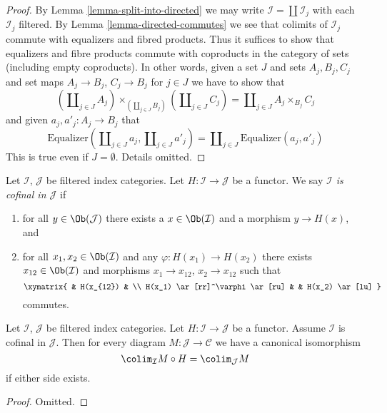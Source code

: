\begin{proof}
By
Lemma \ref{lemma-split-into-directed}
we may write $\mathcal{I} = \coprod \mathcal{I}_j$ with each $\mathcal{I}_j$
filtered. By
Lemma \ref{lemma-directed-commutes}
we see that colimits of $\mathcal{I}_j$ commute with equalizers and
fibred products. Thus it suffices to show that equalizers and fibre products
commute with coproducts in the category of sets (including empty coproducts).
In other words, given a set $J$ and sets $A_j, B_j, C_j$ and set maps
$A_j \to B_j$, $C_j \to B_j$ for $j \in J$ we have to show that
$$
(\coprod\nolimits_{j \in J} A_j)
\times_{(\coprod\nolimits_{j \in J} B_j)}
(\coprod\nolimits_{j \in J} C_j)
=
\coprod\nolimits_{j \in J} A_j \times_{B_j} C_j
$$
and given $a_j, a'_j : A_j \to B_j$ that
$$
\text{Equalizer}(
\coprod\nolimits_{j \in J} a_j,
\coprod\nolimits_{j \in J} a'_j)
=
\coprod\nolimits_{j \in J}
\text{Equalizer}(a_j, a'_j)
$$
This is true even if $J = \emptyset$. Details omitted.
\end{proof}

\begin{definition}
\label{definition-cofinal-filtered}
Let $\mathcal{I}$, $\mathcal{J}$ be filtered index categories.
Let $H : \mathcal{I} \to \mathcal{J}$ be a functor. We say
{\it $\mathcal{I}$ is cofinal in $\mathcal{J}$} if
\begin{enumerate}
\item for all $y \in \Ob(\mathcal{J})$ there exists a
$x \in \Ob(\mathcal{I})$ and a morphism $y \to H(x)$, and
\item for all $x_1, x_2 \in \Ob(\mathcal{I})$ and any
$\varphi : H(x_1) \to H(x_2)$ there exists $x_{12} \in \Ob(\mathcal{I})$
and morphisms $x_1 \to x_{12}$, $x_2 \to x_{12}$ such that
$$
\xymatrix{
& H(x_{12}) & \\
H(x_1) \ar[rr]^\varphi \ar[ru] & & H(x_2) \ar[lu]
}
$$
commutes.
\end{enumerate}
\end{definition}

\begin{lemma}
\label{lemma-cofinal-filtered}
Let $\mathcal{I}$, $\mathcal{J}$ be filtered index categories.
Let $H : \mathcal{I} \to \mathcal{J}$ be a functor. Assume
$\mathcal{I}$ is cofinal in $\mathcal{J}$. Then for every diagram
$M : \mathcal{J} \to \mathcal{C}$ we have a canonical isomorphism
$$
\colim_\mathcal{I} M \circ H
=
\colim_\mathcal{J} M
$$
if either side exists.
\end{lemma}

\begin{proof}
Omitted.
\end{proof}



